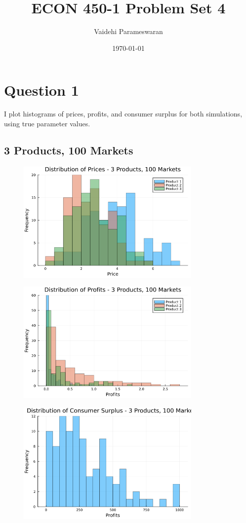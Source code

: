 \documentclass[11pt]{article}
\author{Vaidehi Parameswaran}
\date{\today}
\title{ECON 450-1 Problem Set 4}
\begin{document}
\section*{Question 1}

I plot histograms of prices, profits, and consumer surplus for both simulations, using true parameter values. 

\subsection*{3 Products, 100 Markets}
\begin{figure}[H]
\centering
\includegraphics[width=0.8\textwidth]{outputs/prices_3prods_100mkts.png}
\end{figure}

\begin{figure}[H]
\centering
\includegraphics[width=0.8\textwidth]{outputs/profits_3prods_100mkts.png}
\end{figure}

\begin{figure}[H]
\centering
\includegraphics[width=0.8\textwidth]{outputs/cs_3prods_100mkts.png}
\end{figure}
        
\end{document}
